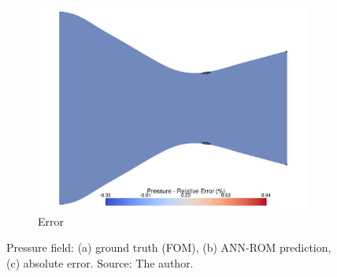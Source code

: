 \documentclass[tg, EN]{ufabcFHZh_tg}
\begin{document}
\begin{figure}[H]
\begin{subfigure}[b]{0.32\textwidth}
        \includegraphics[width=\textwidth]{Figuras/nn_error_pressure.pdf}
        \caption{Error}
    \end{subfigure}
    \caption{Pressure field: (a) ground truth (FOM), (b) ANN-ROM prediction, (c) absolute error. Source: The author.}
    \label{fig:nn_reconstruction_pressure}
\end{figure}
\end{document}
